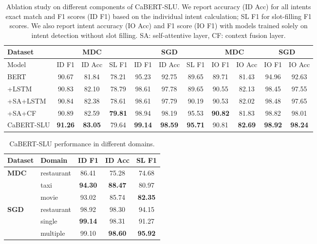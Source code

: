 \documentclass[a4paper]{article}
\begin{document}
\begin{table}[ht]
\caption{Ablation study on different components of CaBERT-SLU. We report accuracy (ID Acc) for all intents exact match and F1 scores (ID F1) based on the individual intent calculation; SL F1 for slot-filling F1 scores. We also report intent accuracy (IO Acc) and F1 score (IO F1) with models trained solely on intent detection without slot filling. SA: self-attentive layer, CF: context fusion layer.} %
\label{tab:ablation}
\footnotesize
\centering %
\hspace*{-0.7cm}
\begin{tabular}{l||c|c|c|c|c|c||c|c|c|c}
\toprule
\textbf{Dataset}
&\multicolumn{3}{|c}{\textbf{MDC}}
&\multicolumn{3}{|c}{\textbf{SGD}}
&\multicolumn{2}{||c}{\textbf{MDC}}
&\multicolumn{2}{|c}{\textbf{SGD}}\\
\midrule
\hline
Model & ID F1 & ID Acc & SL F1 & ID F1 & ID Acc & SL F1 & IO F1 & IO Acc & IO F1 & IO Acc\\
\hline
BERT                        & 90.67 & 81.84 & 78.21 & 95.23 & 92.75 & 89.65 & 89.71 & 81.43 & 94.96 & 92.63\\
\;+LSTM                     & 90.83 & 82.10 & 78.79 & 98.61 & 97.78 & 89.65 & 90.55 & 82.13 & 98.45 & 97.55\\
\;+SA+LSTM                  & 90.84 & 82.38 & 78.61 & 98.61 & 97.79 & 90.19 & 90.53 & 82.02 & 98.48 & 97.65\\
\;+SA+CF                    & 90.89 & 82.59 & \textbf{79.81} & 98.94 & 98.19 & 95.53 & \textbf{90.82} & 81.83 & 98.82 & 98.01\\
\hline
CaBERT-SLU  & \textbf{91.26} & \textbf{83.05}	& 79.64	& \textbf{99.14}	& \textbf{98.59}	& \textbf{95.71} 
                              & 90.81 & \textbf{82.69} & \textbf{98.92} & \textbf{98.24}\\
\bottomrule

\end{tabular}
\label{table:ablation} %
\end{table}

\begin{table}[t]
  \caption{CaBERT-SLU performance in different domains.}
  \label{tab:domain}
  \footnotesize
  \centering
  \begin{tabular}{ll||c|c|c}
    \toprule
    \textbf{Dataset}      & \textbf{Domain} & ID F1 & ID Acc & SL F1       \\
    \midrule
    \multirow{3}{*}{\textbf{MDC}}&restaurant & 86.41	& 75.28	& 74.68 \\
    &taxi & \textbf{94.30} & \textbf{88.47} & 80.97 \\
    &movie & 93.02 & 85.74 & \textbf{82.35} \\
    \midrule
    \multirow{3}{*}{\textbf{SGD}}&restaurant & 98.92 & 98.30 & 94.15 \\
    &single & \textbf{99.14} & 98.31 & 91.27 \\
    &multiple & 99.10 & \textbf{98.60} & \textbf{95.92} \\
    \bottomrule
  \end{tabular}
\end{table}
\end{document}
